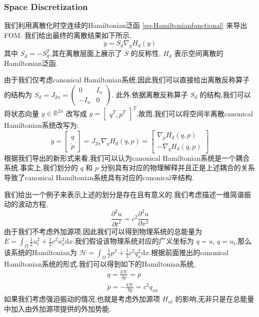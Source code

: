 \documentclass[11pt]{article}
\begin{document}
\subsubsection{Space Discretization}
\label{sec:orgb07dad8}
我们利用离散化时空连续的Hamiltonian泛函 \eqref{eq-Hamiltonianfunctional} 来导出FOM. 我们给出最终的离散结果如下所示,
\begin{equation}
\label{space discretize FOM}
\dot{y}=S_d\nabla_yH_d(y)
\end{equation}
其中 \(S_d=-S_d^T\),其在离散层面上展示了 \(S\) 的反称性, \(H_d\) 表示空间离散的Hamiltonian泛函.

由于我们仅考虑canonical Hamiltonian系统,因此我们可以直接给出离散反称算子的结构为 \(S_d=J_{2n}=\begin{pmatrix}0&I_n\\-I_n&0\end{pmatrix}\). 此外,依据离散反称算子 \(S_d\) 的结构,我们可以将状态向量 \(y\in \mathbb{R}^{2n}\) 改写成 \(y=\begin{bmatrix}q^T,p^T\end{bmatrix}^T\).故而,我们可以将空间半离散canonical Hamiltonian系统改写为:
\begin{equation}
\dot{y}=\begin{bmatrix}\dot{q}\\ \dot{p}\end{bmatrix}=J_{2n}\nabla_y H_d(q,p)=\begin{bmatrix}\nabla_pH_d(q,p)\\-\nabla_qH_d(q,p)\end{bmatrix}
\end{equation}
根据我们导出的新形式来看,我们可以认为canonical Hamiltonian系统是一个耦合系统.事实上,我们划分的 \(q\) 和 \(p\) 分别具有对应的物理解释并且正是上述耦合的关系导致了canonical Hamiltonian系统具有对应的canonical辛结构.

我们给出一个例子来表示上述的划分是存在且有意义的.我们考虑描述一维简谐振动的波动方程,
\begin{equation*}
\frac{\partial^2u}{\partial t^2}=c^2 \frac{\partial^2u}{\partial x^2}
\end{equation*}
由于我们不考虑外加源项,因此我们可以得到物理系统的总能量为 \(E=\int_{\Omega}\frac{1}{2}u_t^2+\frac{1}{2}c^2u_x^2\mathrm{d}x\).我们假设该物理系统对应的广义坐标为 \(q=u\), \(q=u_t\),那么该系统的Hamiltonian为 \(\mathcal{H}=\int_{\Omega}\frac{1}{2}p^2+\frac{1}{2}c^2q_x^2\mathrm{d}x\).根据前面推出的canonical Hamiltonian系统的形式,我们可以得到如下的Hamiltonian系统,
\begin{align*}
&\dot{q}=\frac{\delta \mathcal{H}}{\delta p}=p\\
&\dot{p}=-\frac{\delta \mathcal{H}}{\delta q}=c^2q_{xx}
\end{align*}
如果我们考虑强迫振动的情况,也就是考虑外加源项 \(H_{nl}\) 的影响,无非只是在总能量中加入由外加源项提供的外加势能.
\end{document}
